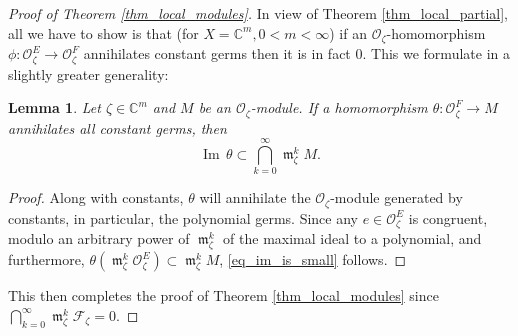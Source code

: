 \documentclass{amsart}
\numberwithin{equation}{section}
\theoremstyle{definition}
\theoremstyle{plain}
\newtheorem{lemma}[definition]{Lemma}
\theoremstyle{remark}
\begin{document}
\begin{proof}[Proof of Theorem \ref{thm_local_modules}]
In view of Theorem \ref{thm_local_partial}, all we have to show is that 
(for $X=\mathbb{C}^m, 0<m<\infty$) if an ${\ensuremath{\mathcal{{O}}}}_\zeta$-homomorphism
$\phi:{\ensuremath{\mathcal{{O}}}}^E_\zeta\rightarrow{\ensuremath{\mathcal{{O}}}}^F_\zeta$ annihilates
constant germs then it is in fact 0.
This we formulate in a slightly greater generality:
\begin{lemma}\label{lemma_im_is_small}
Let $\zeta\in\mathbb{C}^m$ and $M$ be an ${\ensuremath{\mathcal{{O}}}}_\zeta$-module.
If a homomorphism $\theta:{\ensuremath{\mathcal{{O}}}}^F_\zeta\rightarrow M$ annihilates
all constant germs, then 
\begin{equation}\label{eq_im_is_small}
{{\mathop{\mathrm{Im\,}}}} \theta\subset\bigcap_{k=0}^\infty {{\mathop{\mathfrak{m}}}}_\zeta^k M.
\end{equation}
\end{lemma}
\begin{proof}
Along with constants, $\theta$ will annihilate
the ${\ensuremath{\mathcal{{O}}}}_\zeta$-module generated by constants, in particular, 
the polynomial germs.
Since any $e\in{\ensuremath{\mathcal{{O}}}}^E_\zeta$ is congruent, modulo an arbitrary power
of ${{\mathop{\mathfrak{m}}}}_\zeta^k$ of the maximal ideal to a polynomial, and furthermore,
$\theta({{\mathop{\mathfrak{m}}}}_\zeta^k{\ensuremath{\mathcal{{O}}}}^E_\zeta)\subset{{\mathop{\mathfrak{m}}}}_\zeta^kM$,
\eqref{eq_im_is_small} follows.
\end{proof}
This then completes the proof of Theorem \ref{thm_local_modules}
since $\bigcap_{k=0}^\infty {{\mathop{\mathfrak{m}}}}_\zeta^k{\ensuremath{\mathcal{{F}}}}_\zeta=0$.
\end{proof}
\end{document}

